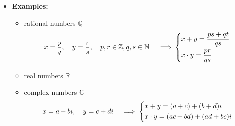 \documentclass[11pt,twoside]{report}
\newcommand{\bbN}{{\mathbb{N}}}
\newcommand{\bbR}{{\mathbb{R}}}
\newcommand{\bbQ}{{\mathbb{Q}}}
\newcommand{\bbZ}{{\mathbb{Z}}}
\newcommand{\bbC}{{\mathbb{C}}}
\begin{document}
\begin{itemize}
\begin{itemize}
\item Distributivity of multiplication over addition:
\[
 a \cdot (b + c) = (a \cdot b) + (a \cdot c)
 \]
\end{itemize}


\item \textbf{Examples:} 

\begin{itemize}
\item rational numbers $\bbQ$ %
\[
x = \frac{p}{q} , \quad y  = \frac{r}{s} ,\quad  p,r \in \bbZ, q,s \in \bbN  \quad \implies\begin{dcases}  x + y  = \frac{ p s + q t}{ qs}  \\  x \cdot y =  \frac{ p r}{ qs}  
\end{dcases}
\]
\item real numbers $\bbR$%
\item complex numbers $\bbC$ %
\[
x = a + bi, \quad y  = c +  di  \quad \implies\begin{dcases}  x + y  = (a + c)  + ( b+ d) i  \\  x \cdot y =  (ac - bd)  + (ad + bc) i 
\end{dcases}
\]


\end{itemize}
\end{itemize}
\end{document}
